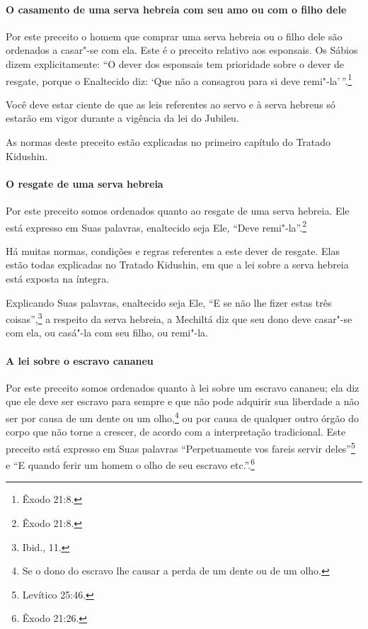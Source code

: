 \begin{multicols}{2}
\paragraph{O casamento de uma serva hebreia com seu amo ou com o filho dele}

Por este preceito o homem que comprar uma serva hebreia ou o filho dele
são ordenados a casar"-se com ela. Este é o preceito relativo aos
esponsais. Os Sábios dizem explicitamente: ``O dever dos esponsais tem
prioridade sobre o dever de resgate, porque o Enaltecido diz: `Que não a
consagrou para si deve remi"-la'\,''.\footnote{Êxodo 21:8.}

Você deve estar ciente de que as leis referentes ao servo e à serva
hebreus só estarão em vigor durante a vigência da lei do Jubileu.

As normas deste preceito estão explicadas no primeiro capítulo do
Tratado Kidushin\starr.

\paragraph{O resgate de uma serva hebreia}

Por este preceito somos ordenados quanto ao resgate de uma serva
hebreia. Ele está expresso em Suas palavras, enaltecido seja Ele, ``Deve
remi"-la''.\footnote{Êxodo 21:8.}

Há muitas normas, condições e regras referentes a este dever de
resgate. Elas estão todas explicadas no Tratado Kidushin\starr, em que a lei
sobre a serva hebreia está exposta na íntegra.

Explicando Suas palavras, enaltecido seja Ele, ``E se não lhe fizer
estas três coisas'',\footnote{Ibid., 11.} a respeito da serva hebreia, a
Mechiltá\starr{} diz que seu dono deve casar"-se com ela, ou casá"-la com seu
filho, ou remi"-la.

\paragraph{A lei sobre o escravo cananeu}

Por este preceito somos ordenados quanto à lei sobre um escravo cananeu;
ela diz que ele deve ser escravo para sempre e que não pode adquirir sua
liberdade a não ser por causa de um dente ou um
olho,\footnote{Se o dono do escravo lhe causar a perda de um dente ou de um olho.} ou por causa de qualquer outro órgão do
corpo que não torne a crescer, de acordo com a interpretação
tradicional. Este preceito está expresso em Suas palavras
``Perpetuamente vos fareis servir deles''\footnote{Levítico 25:46.} e ``E quando
ferir um homem o olho de seu escravo etc.''.\footnote{Êxodo 21:26.}


\end{multicols}
